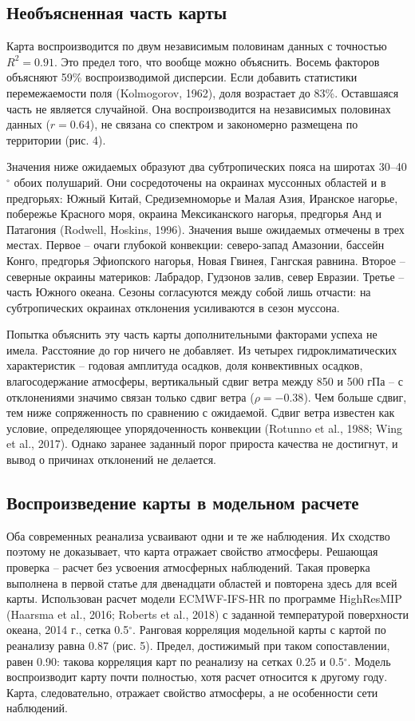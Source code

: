 \documentclass[12pt,a4paper]{article}
\begin{document}
\subsection{Необъясненная часть карты}

Карта воспроизводится по двум независимым половинам данных с точностью $R^2 = 0.91$. Это предел того, что вообще можно объяснить. Восемь факторов объясняют 59\% воспроизводимой дисперсии. Если добавить статистики перемежаемости поля (Kolmogorov, 1962), доля возрастает до 83\%. Оставшаяся часть не является случайной. Она воспроизводится на независимых половинах данных ($r = 0.64$), не связана со спектром и закономерно размещена по территории (рис. 4).

Значения ниже ожидаемых образуют два субтропических пояса на широтах 30--40$^\circ$ обоих полушарий. Они сосредоточены на окраинах муссонных областей и в предгорьях: Южный Китай, Средиземноморье и Малая Азия, Иранское нагорье, побережье Красного моря, окраина Мексиканского нагорья, предгорья Анд и Патагония (Rodwell, Hoskins, 1996). Значения выше ожидаемых отмечены в трех местах. Первое -- очаги глубокой конвекции: северо-запад Амазонии, бассейн Конго, предгорья Эфиопского нагорья, Новая Гвинея, Гангская равнина. Второе -- северные окраины материков: Лабрадор, Гудзонов залив, север Евразии. Третье -- часть Южного океана. Сезоны согласуются между собой лишь отчасти: на субтропических окраинах отклонения усиливаются в сезон муссона.

Попытка объяснить эту часть карты дополнительными факторами успеха не имела. Расстояние до гор ничего не добавляет. Из четырех гидроклиматических характеристик -- годовая амплитуда осадков, доля конвективных осадков, влагосодержание атмосферы, вертикальный сдвиг ветра между 850 и 500 гПа -- с отклонениями значимо связан только сдвиг ветра ($\rho = -0.38$). Чем больше сдвиг, тем ниже сопряженность по сравнению с ожидаемой. Сдвиг ветра известен как условие, определяющее упорядоченность конвекции (Rotunno et al., 1988; Wing et al., 2017). Однако заранее заданный порог прироста качества не достигнут, и вывод о причинах отклонений не делается.

\subsection{Воспроизведение карты в модельном расчете}

Оба современных реанализа усваивают одни и те же наблюдения. Их сходство поэтому не доказывает, что карта отражает свойство атмосферы. Решающая проверка -- расчет без усвоения атмосферных наблюдений. Такая проверка выполнена в первой статье для двенадцати областей и повторена здесь для всей карты. Использован расчет модели ECMWF-IFS-HR по программе HighResMIP (Haarsma et al., 2016; Roberts et al., 2018) с заданной температурой поверхности океана, 2014 г., сетка 0.5$^\circ$. Ранговая корреляция модельной карты с картой по реанализу равна 0.87 (рис. 5). Предел, достижимый при таком сопоставлении, равен 0.90: такова корреляция карт по реанализу на сетках 0.25 и 0.5$^\circ$. Модель воспроизводит карту почти полностью, хотя расчет относится к другому году. Карта, следовательно, отражает свойство атмосферы, а не особенности сети наблюдений.
\end{document}
